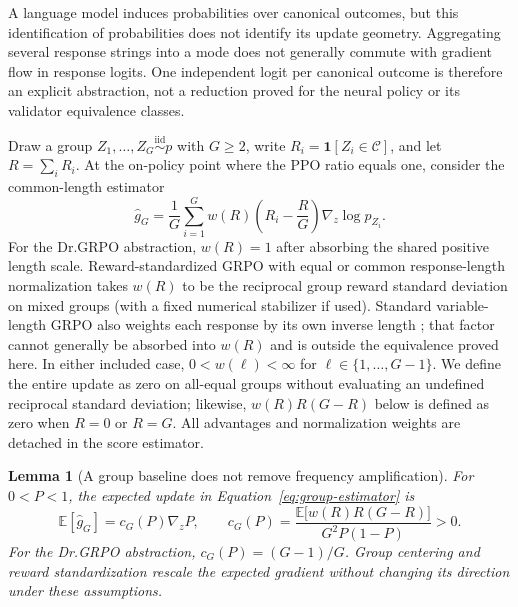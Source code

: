 \documentclass{article}
\newcommand{\enforcehalffinalproseline}{%
  \setlength{\parfillskip}{0pt plus .20\linewidth}}
\newcommand{\1}{\mathbf 1}
\newcommand{\E}{\mathbb E}
\newtheorem{lemma}{Lemma}[section]
\theoremstyle{remark}
\theoremstyle{definition}
\theoremstyle{plain}
\begin{document}
A language model induces probabilities over canonical outcomes, but this
identification of probabilities does not identify its update geometry.
Aggregating several response strings into a mode does not generally commute
with gradient flow in response logits. One independent logit per canonical
outcome is therefore an explicit abstraction, not a reduction proved for the
neural policy or its validator equivalence classes.

Draw a group $Z_1,\ldots,Z_G\stackrel{\mathrm{iid}}{\sim}p$ with $G\ge2$,
write $R_i=\1[Z_i\in\mathcal C]$, and let $R=\sum_iR_i$. At the on-policy
point where the PPO ratio equals one, consider the common-length estimator
\begin{equation}
  \widehat g_G
  =\frac1G\sum_{i=1}^G
   w(R)\left(R_i-\frac{R}{G}\right)\nabla_z\log p_{Z_i}.
  \label{eq:group-estimator}
\end{equation}
For the Dr.GRPO abstraction, $w(R)=1$ after absorbing the shared positive
length scale. Reward-standardized GRPO with equal or common response-length
normalization takes $w(R)$ to be the reciprocal group reward standard
deviation on mixed groups (with a fixed numerical stabilizer if used).
Standard variable-length GRPO also weights each response by its own inverse
length \citep{shao2024deepseekmath,liu2025understanding}; that factor cannot
generally be absorbed into $w(R)$ and is outside the equivalence proved here.
In either included case, $0<w(\ell)<\infty$ for
$\ell\in\{1,\ldots,G-1\}$. We define the entire update as zero on all-equal
groups without evaluating an undefined reciprocal standard deviation;
likewise, $w(R)R(G-R)$ below is defined as zero when $R=0$ or $R=G$. All
advantages and normalization weights are detached in the score estimator.

\begin{lemma}[A group baseline does not remove frequency amplification]
\enforcehalffinalproseline
\label{lem:grpo-mean}
For $0<P<1$, the expected update in Equation~\eqref{eq:group-estimator} is
\begin{equation}
  \E[\widehat g_G]
  =c_G(P)\nabla_z P,
  \qquad
  c_G(P)=
  \frac{\E\!\big[w(R)R(G-R)\big]}{G^2P(1-P)}>0.
  \label{eq:expected-group-gradient}
\end{equation}
For the Dr.GRPO abstraction, $c_G(P)=(G-1)/G$. Group centering and reward
standardization rescale the expected gradient without changing its direction
under these assumptions.
\end{lemma}
\end{document}
